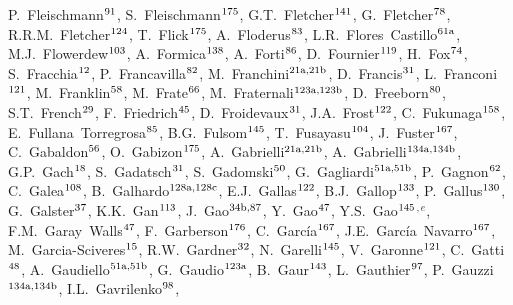 \begin{flushleft}
P.~Fleischmann$^\textrm{\scriptsize 91}$,
S.~Fleischmann$^\textrm{\scriptsize 175}$,
G.T.~Fletcher$^\textrm{\scriptsize 141}$,
G.~Fletcher$^\textrm{\scriptsize 78}$,
R.R.M.~Fletcher$^\textrm{\scriptsize 124}$,
T.~Flick$^\textrm{\scriptsize 175}$,
A.~Floderus$^\textrm{\scriptsize 83}$,
L.R.~Flores~Castillo$^\textrm{\scriptsize 61a}$,
M.J.~Flowerdew$^\textrm{\scriptsize 103}$,
A.~Formica$^\textrm{\scriptsize 138}$,
A.~Forti$^\textrm{\scriptsize 86}$,
D.~Fournier$^\textrm{\scriptsize 119}$,
H.~Fox$^\textrm{\scriptsize 74}$,
S.~Fracchia$^\textrm{\scriptsize 12}$,
P.~Francavilla$^\textrm{\scriptsize 82}$,
M.~Franchini$^\textrm{\scriptsize 21a,21b}$,
D.~Francis$^\textrm{\scriptsize 31}$,
L.~Franconi$^\textrm{\scriptsize 121}$,
M.~Franklin$^\textrm{\scriptsize 58}$,
M.~Frate$^\textrm{\scriptsize 66}$,
M.~Fraternali$^\textrm{\scriptsize 123a,123b}$,
D.~Freeborn$^\textrm{\scriptsize 80}$,
S.T.~French$^\textrm{\scriptsize 29}$,
F.~Friedrich$^\textrm{\scriptsize 45}$,
D.~Froidevaux$^\textrm{\scriptsize 31}$,
J.A.~Frost$^\textrm{\scriptsize 122}$,
C.~Fukunaga$^\textrm{\scriptsize 158}$,
E.~Fullana~Torregrosa$^\textrm{\scriptsize 85}$,
B.G.~Fulsom$^\textrm{\scriptsize 145}$,
T.~Fusayasu$^\textrm{\scriptsize 104}$,
J.~Fuster$^\textrm{\scriptsize 167}$,
C.~Gabaldon$^\textrm{\scriptsize 56}$,
O.~Gabizon$^\textrm{\scriptsize 175}$,
A.~Gabrielli$^\textrm{\scriptsize 21a,21b}$,
A.~Gabrielli$^\textrm{\scriptsize 134a,134b}$,
G.P.~Gach$^\textrm{\scriptsize 18}$,
S.~Gadatsch$^\textrm{\scriptsize 31}$,
S.~Gadomski$^\textrm{\scriptsize 50}$,
G.~Gagliardi$^\textrm{\scriptsize 51a,51b}$,
P.~Gagnon$^\textrm{\scriptsize 62}$,
C.~Galea$^\textrm{\scriptsize 108}$,
B.~Galhardo$^\textrm{\scriptsize 128a,128c}$,
E.J.~Gallas$^\textrm{\scriptsize 122}$,
B.J.~Gallop$^\textrm{\scriptsize 133}$,
P.~Gallus$^\textrm{\scriptsize 130}$,
G.~Galster$^\textrm{\scriptsize 37}$,
K.K.~Gan$^\textrm{\scriptsize 113}$,
J.~Gao$^\textrm{\scriptsize 34b,87}$,
Y.~Gao$^\textrm{\scriptsize 47}$,
Y.S.~Gao$^\textrm{\scriptsize 145}$$^{,e}$,
F.M.~Garay~Walls$^\textrm{\scriptsize 47}$,
F.~Garberson$^\textrm{\scriptsize 176}$,
C.~Garc\'ia$^\textrm{\scriptsize 167}$,
J.E.~Garc\'ia~Navarro$^\textrm{\scriptsize 167}$,
M.~Garcia-Sciveres$^\textrm{\scriptsize 15}$,
R.W.~Gardner$^\textrm{\scriptsize 32}$,
N.~Garelli$^\textrm{\scriptsize 145}$,
V.~Garonne$^\textrm{\scriptsize 121}$,
C.~Gatti$^\textrm{\scriptsize 48}$,
A.~Gaudiello$^\textrm{\scriptsize 51a,51b}$,
G.~Gaudio$^\textrm{\scriptsize 123a}$,
B.~Gaur$^\textrm{\scriptsize 143}$,
L.~Gauthier$^\textrm{\scriptsize 97}$,
P.~Gauzzi$^\textrm{\scriptsize 134a,134b}$,
I.L.~Gavrilenko$^\textrm{\scriptsize 98}$,
$$
\end{flushleft}
